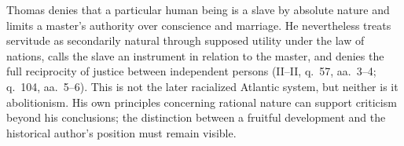 Thomas denies that a particular human being is a slave by absolute nature and
limits a master's authority over conscience and marriage.  He nevertheless
treats servitude as secondarily natural through supposed utility under the law
of nations, calls the slave an instrument in relation to the master, and denies
the full reciprocity of justice between independent persons (II--II, q.~57,
aa.~3--4; q.~104, aa.~5--6).  This is not the later racialized Atlantic system,
but neither is it abolitionism.  His own principles concerning rational nature
can support criticism beyond his conclusions; the distinction between a
fruitful development and the historical author's position must remain visible.

